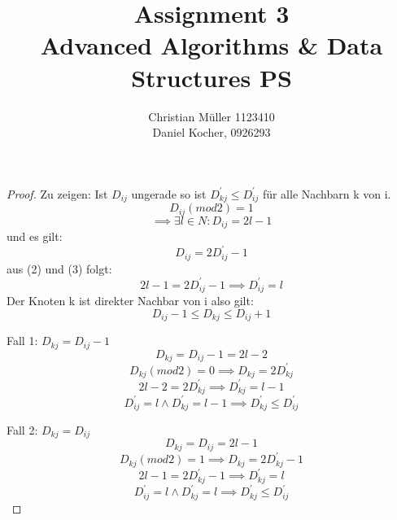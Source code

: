 \documentclass{article}
\begin{document}
\title{Assignment 3 \\ Advanced Algorithms \& Data Structures PS}%
\author{Christian Müller 1123410 \\ Daniel Kocher, 0926293}%
\maketitle


 
 \begin{proof}
 Zu zeigen: Ist $D_{ij}$ ungerade so ist $D^{'}_{kj} \leq D^{'}_{ij}$ für alle Nachbarn k von i.
\begin{equation}
D_{ij}(mod 2) = 1
\end{equation}
\begin{equation}
\implies \exists l \in N: D_{ij} = 2l-1
\end{equation}
und es gilt:
\begin{equation}
D_{ij} = 2D^{'}_{ij}-1
\end{equation}
aus (2) und (3) folgt: 
\begin{equation}
2l-1 = 2D^{'}_{ij}-1 \implies D^{'}_{ij} = l
\end{equation}
Der Knoten k ist direkter Nachbar von i also gilt:
\begin{equation}
D_{ij}-1 \leq D_{kj} \leq D_{ij}+1
\end{equation}

Fall 1: $D_{kj} = D_{ij}-1$
\begin{equation}
D_{kj} = D_{ij}-1=2l-2
\end{equation}
\begin{equation}
D_{kj}(mod2) = 0 \implies D_{kj}=2D^{'}_{kj}
\end{equation}
\begin{equation}
2l-2 = 2D^{'}_{kj} \implies D^{'}_{kj}=l-1
\end{equation}
\begin{equation}
D^{'}_{ij} =l \wedge D^{'}_{kj} =l-1 \implies D^{'}_{kj} \leq D^{'}_{ij}
\end{equation}

Fall 2: $D_{kj} = D_{ij}$
\begin{equation}
D_{kj} = D_{ij}=2l-1
\end{equation}
\begin{equation}
D_{kj}(mod2) = 1 \implies D_{kj}=2D^{'}_{kj}-1
\end{equation}
\begin{equation}
2l-1 = 2D^{'}_{kj}-1 \implies D^{'}_{kj}=l
\end{equation}
\begin{equation}
D^{'}_{ij} =l \wedge D^{'}_{kj} =l \implies D^{'}_{kj} \leq D^{'}_{ij}
\end{equation}


\end{proof}
\end{document}
